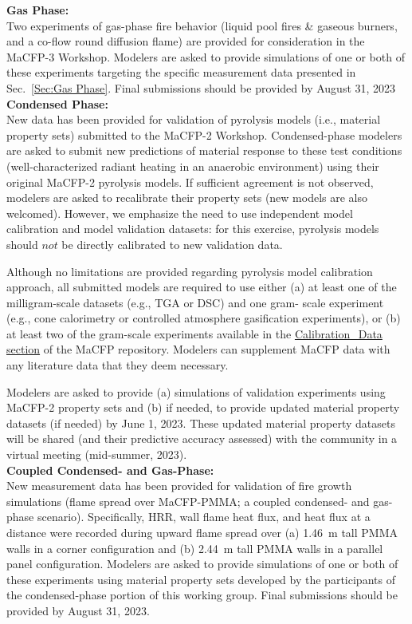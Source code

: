 \documentclass[12pt]{article}
\begin{document}
\textbf{Gas Phase:}\\
Two experiments of gas-phase fire behavior (liquid pool fires \& gaseous burners, and a co-flow round diffusion flame) are provided for consideration in the MaCFP-3 Workshop. Modelers are asked to provide simulations of one or both of these experiments targeting the specific measurement data presented in Sec.~\ref{Sec:Gas Phase}. Final submissions should be provided by August 31, 2023\\

\textbf{Condensed Phase:}\\
New data has been provided for validation of pyrolysis models (i.e., material property sets) submitted to the MaCFP-2 Workshop. Condensed-phase modelers are asked to submit new predictions of material response to these test conditions (well-characterized radiant heating in an anaerobic environment) using their original MaCFP-2 pyrolysis models. If sufficient agreement is not observed, modelers are asked to recalibrate their property sets (new models are also welcomed). However, we emphasize the need to use independent model calibration and model validation datasets: for this exercise, pyrolysis models should $not$ be directly calibrated to new validation data.  

Although no limitations are provided regarding pyrolysis model calibration approach, all submitted models are required to use either (a) at least one of the milligram-scale datasets (e.g., TGA or DSC) and one gram- scale experiment (e.g., cone calorimetry or controlled atmosphere gasification experiments), or (b) at least two of the gram-scale experiments available in the \href{https://github.com/MaCFP/matl-db/tree/master/PMMA/Calibration_Data}{Calibration\_Data section} of the MaCFP repository. Modelers can supplement MaCFP data with any literature data that they deem necessary. 

Modelers are asked to provide (a) simulations of validation experiments using MaCFP-2 property sets and (b) if needed, to provide updated material property datasets (if needed) by June 1, 2023. These updated material property datasets will be shared (and their predictive accuracy assessed) with the community in a virtual meeting (mid-summer, 2023).\\

\textbf{Coupled Condensed- and Gas-Phase:}\\
New measurement data has been provided for validation of fire growth simulations (flame spread over MaCFP-PMMA; a coupled condensed- and gas-phase scenario). Specifically, HRR, wall flame heat flux, and heat flux at a distance were recorded during upward flame spread over (a) 1.46~m tall PMMA walls in a corner configuration and (b) 2.44~m tall PMMA walls in a parallel panel configuration.
Modelers are asked to provide simulations of one or both of these experiments using material property sets developed by the participants of the condensed-phase portion of this working group. Final submissions should be provided by August 31, 2023. 
\end{document}
